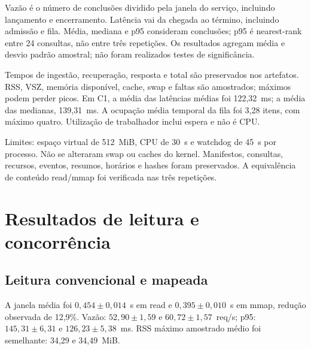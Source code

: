 \documentclass[12pt,a4paper]{article}
\newcommand{\secao}[1]{\clearpage\section{#1}}
\begin{document}
  Vazão é o número de conclusões dividido pela janela do serviço, incluindo lançamento e encerramento. Latência vai da chegada ao término, incluindo admissão e fila. Média, mediana e p95 consideram conclusões; p95 é nearest-rank entre 24 consultas, não entre três repetições. Os resultados agregam média e desvio padrão amostral; não foram realizados testes de significância.

  Tempos de ingestão, recuperação, resposta e total são preservados nos artefatos. RSS, VSZ, memória disponível, cache, swap e faltas são amostrados; máximos podem perder picos. Em C1, a média das latências médias foi 122,32~ms; a média das medianas, 139,31~ms. A ocupação média temporal da fila foi 3,28 itens, com máximo quatro. Utilização de trabalhador inclui espera e não é CPU.

  Limites: espaço virtual de 512~MiB, CPU de 30~s e watchdog de 45~s por processo. Não se alteraram swap ou caches do kernel. Manifestos, consultas, recursos, eventos, resumos, horários e hashes foram preservados. A equivalência de conteúdo read/mmap foi verificada nas três repetições.

  \secao{Resultados de leitura e concorrência}
  \subsection{Leitura convencional e mapeada}
  A janela média foi $0{,}454\pm0{,}014$~s em read e $0{,}395\pm0{,}010$~s em mmap, redução observada de 12,9\%. Vazão: $52{,}90\pm1{,}59$ e $60{,}72\pm1{,}57$~req/s; p95: $145{,}31\pm6{,}31$ e $126{,}23\pm5{,}38$~ms. RSS máximo amostrado médio foi semelhante: 34,29 e 34,49~MiB.
\end{document}
